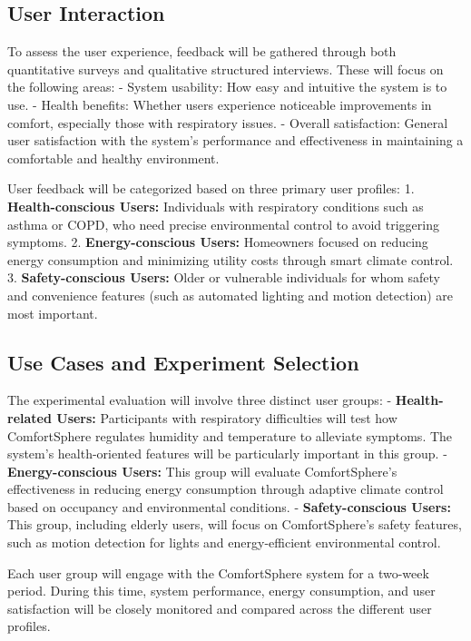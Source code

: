 \documentclass[a4paper]{scrartcl}
\begin{document}
	\subsection{User Interaction}
	To assess the user experience, feedback will be gathered through both quantitative surveys and qualitative structured interviews. These will focus on the following areas:
	- System usability: How easy and intuitive the system is to use.
	- Health benefits: Whether users experience noticeable improvements in comfort, especially those with respiratory issues.
	- Overall satisfaction: General user satisfaction with the system's performance and effectiveness in maintaining a comfortable and healthy environment.

	User feedback will be categorized based on three primary user profiles:
	1. \textbf{Health-conscious Users:} Individuals with respiratory conditions such as asthma or COPD, who need precise environmental control to avoid triggering symptoms.
	2. \textbf{Energy-conscious Users:} Homeowners focused on reducing energy consumption and minimizing utility costs through smart climate control.
	3. \textbf{Safety-conscious Users:} Older or vulnerable individuals for whom safety and convenience features (such as automated lighting and motion detection) are most important.

	\subsection{Use Cases and Experiment Selection}
	The experimental evaluation will involve three distinct user groups:
	- \textbf{Health-related Users:} Participants with respiratory difficulties will test how ComfortSphere regulates humidity and temperature to alleviate symptoms. The system's health-oriented features will be particularly important in this group.
	- \textbf{Energy-conscious Users:} This group will evaluate ComfortSphere's effectiveness in reducing energy consumption through adaptive climate control based on occupancy and environmental conditions.
	- \textbf{Safety-conscious Users:} This group, including elderly users, will focus on ComfortSphere's safety features, such as motion detection for lights and energy-efficient environmental control.

	Each user group will engage with the ComfortSphere system for a two-week period. During this time, system performance, energy consumption, and user satisfaction will be closely monitored and compared across the different user profiles.
\end{document}
